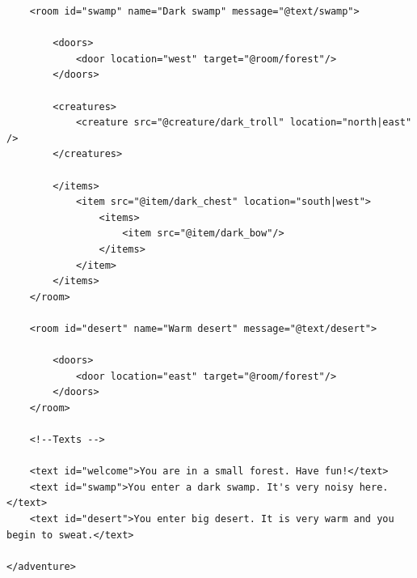 \documentclass[dvips,12pt]{article}
\begin{document}
\begin{appendix}
\begin{verbatim}
    <room id="swamp" name="Dark swamp" message="@text/swamp">

        <doors>
            <door location="west" target="@room/forest"/>
        </doors>

        <creatures>
            <creature src="@creature/dark_troll" location="north|east" />
        </creatures>

        </items>
            <item src="@item/dark_chest" location="south|west">
                <items>
                    <item src="@item/dark_bow"/>
                </items>
            </item>
        </items>
    </room>

    <room id="desert" name="Warm desert" message="@text/desert">

        <doors>
            <door location="east" target="@room/forest"/>
        </doors>
    </room>

    <!--Texts -->

    <text id="welcome">You are in a small forest. Have fun!</text>
    <text id="swamp">You enter a dark swamp. It's very noisy here.</text>
    <text id="desert">You enter big desert. It is very warm and you begin to sweat.</text>

</adventure>
\end{verbatim}
\end{appendix}
\end{document}
